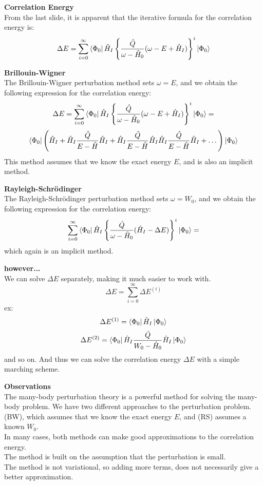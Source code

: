 \documentclass[UKenglish,aspectratio=169,12pt]{beamer}
\begin{document}
\begin{frame}
    \textbf{Correlation Energy}\\
    From the last slide, it is apparent that the iterative formula for the correlation energy is:
    \[
        \Delta E = \sum_{i=0}^\infty \bra{\Phi_0} \hat{H}_I \left\{\frac{\hat{Q}}{\omega-\hat{H}_0}(\omega-E+\hat{H}_I) \right\}^i \ket{\Phi_0}
    \]
\end{frame}

\begin{frame}
    \textbf{Brillouin-Wigner}\\
    The Brillouin-Wigner perturbation method sets $\omega = E$, and we obtain the following expression for the correlation energy:
    \[
        \Delta E = \sum_{i=0}^\infty \bra{\Phi_0} \hat{H}_I \left\{\frac{\hat{Q}}{\omega-\hat{H}_0}(\omega-E+\hat{H}_I) \right\}^i \ket{\Phi_0}=
    \]
    \[
        \bra{ \Phi_0} \left(\hat{H}_I + \hat{H}_I \frac{\hat{Q}}{E-\hat{H}} \hat{H}_I + \hat{H}_I \frac{\hat{Q}}{E-\hat{H}} \hat{H}_I \hat{H}_I \frac{\hat{Q}}{E-\hat{H}} \hat{H}_I +\dots\right)\ket{\Phi_0}
    \]
    This method assumes that we know the exact energy $E$, and is also an implicit method.
\end{frame}

\begin{frame}
    \textbf{Rayleigh-Schrödinger}\\
    The Rayleigh-Schrödinger perturbation method sets $\omega = W_0$, and we obtain the following expression for the correlation energy:
    \[
        \sum_{i=0}^\infty \bra{\Phi_0} \hat{H}_I \left\{\frac{\hat{Q}}{\omega-\hat{H}_0}(\hat{H}_I -\Delta E)\right\}^i \ket{\Phi_0}=
    \]
    which again is an implicit method.
\end{frame}
\begin{frame}
    \textbf{however...}\\
    We can solve $\Delta E$ separately, making it much easier to work with. 
    \[
        \Delta E = \sum_{i=0}^\infty \Delta E^{(i)}
    \]
    ex:
    \[
        \Delta E^{(1)} = \bra{\Phi_0} \hat{H}_I \ket{\Phi_0}
    \]
    \[
        \Delta E^{(2)} = \bra{\Phi_0} \hat{H}_I \frac{\hat{Q}}{W_0-\hat{H}_0} \hat{H}_I \ket{\Phi_0}
    \]
    and so on. And thus we can solve the correlation energy $\Delta E$ with a simple marching scheme.
\end{frame}

\begin{frame}
    \textbf{Observations}\\
    The many-body perturbation theory is a powerful method for solving the many-body problem. We have two different approaches to the perturbation problem.\\
    (BW), which assumes that we know the exact energy $E$, and (RS) assumes a known $W_0$. \\In many cases, both methods can make good approximations to the correlation energy. \\
    The method is built on the assumption that the perturbation is small. \\
    The method is not variational, so adding more terms, does not necessarily give a better approximation.
\end{frame}
\end{document}

